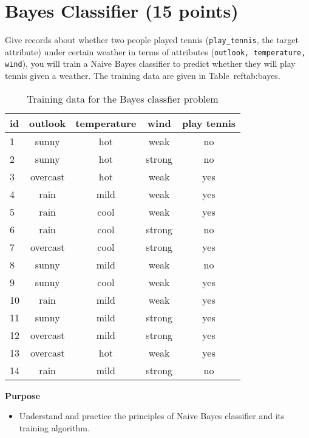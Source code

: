 \section{Bayes Classifier (15 points)}
Give records about whether two people played tennis ({\tt play\_tennis}, the target attribute) under certain weather in terms of  attributes ({\tt outlook, temperature, wind}), you will train a Naive Bayes classifier to predict whether they will play tennis given a weather. The training data are given in Table~ref{tab:bayes}.\\

\begin{table}[!h]
    \label{tab:bayes}
    \centering
    \begin{tabular}{l|ccc|c}
    \hline

    \hline
    \textbf{id} & \textbf{outlook} & \textbf{temperature} & \textbf{wind} & \textbf{play tennis}\\
    \hline
        1 & sunny & hot & weak & no\\
        2 & sunny & hot & strong & no\\
        3 & overcast & hot & weak & yes\\
        4 & rain & mild & weak & yes\\
        5 & rain & cool & weak & yes\\
        6 & rain & cool & strong & no\\
        7 & overcast & cool & strong & yes\\
        8 & sunny & mild & weak & no\\
        9 & sunny & cool & weak & yes\\
        10 & rain & mild & weak & yes\\
        11 & sunny &mild & strong & yes\\
        12 & overcast & mild & strong &  yes\\
        13 & overcast & hot & weak & yes\\
        14 & rain & mild & strong & no\\
    \hline

    \hline
    \end{tabular}
    \caption{Training data for the Bayes classfier problem}
\end{table}

\textbf{Purpose} 
\begin{itemize}
\item Understand and practice the principles of Naive Bayes classifier and its training algorithm.
\end{itemize}

